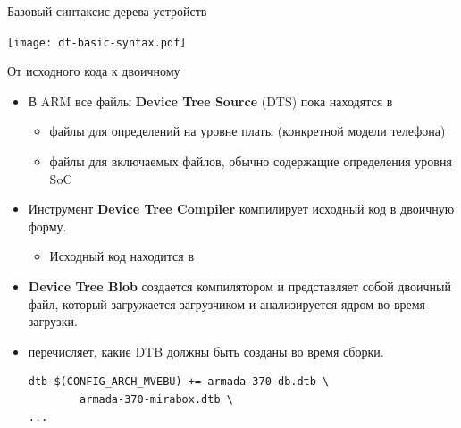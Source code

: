 \documentclass[obeyspaces,spaces,hyphens]{beamer}
\begin{document}
\begin{frame}{Базовый синтаксис дерева устройств}
  \begin{center}
    \texttt{[image: dt-basic-syntax.pdf]}
  \end{center}
\end{frame}

\begin{frame}[fragile]{От исходного кода к двоичному}
  \begin{itemize}
  \item В ARM все файлы {\bf Device Tree Source} (DTS) пока находятся в 
    \begin{itemize}
    \item {} файлы для определений на уровне платы (конкретной модели телефона)
    \item {} файлы для включаемых файлов, обычно содержащие определения уровня SoC
    \end{itemize}
  \item Инструмент {\bf Device Tree Compiler} компилирует исходный код в двоичную форму.
    \begin{itemize}
    \item Исходный код находится в 
    \end{itemize}
  \item {\bf Device Tree Blob} создается компилятором и представляет собой двоичный файл, который загружается загрузчиком и анализируется ядром во время загрузки.
  \item {} перечисляет, какие DTB должны быть созданы во время сборки.
    \begin{block}{}
      \tiny
\begin{verbatim}
dtb-$(CONFIG_ARCH_MVEBU) += armada-370-db.dtb \
        armada-370-mirabox.dtb \
...
\end{verbatim}
    \end{block}
  \end{itemize}
\end{frame}
\end{document}
